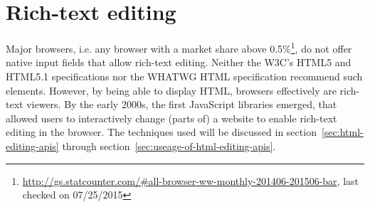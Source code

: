 \section{Rich-text editing}

Major browsers, i.e. any browser with a market share above 0.5\%\footnote{\url{http://gs.statcounter.com/\#all-browser-ww-monthly-201406-201506-bar}, last checked on 07/25/2015}, do not offer native input fields that allow rich-text editing. Neither the W3C's HTML5 and HTML5.1 specifications nor the WHATWG HTML specification recommend such elements. However, by being able to display HTML, browsers effectively are rich-text viewers. By the early 2000s, the first JavaScript libraries emerged, that allowed users to interactively change (parts of) a website to enable rich-text editing in the browser. The techniques used will be discussed in section~\ref{sec:html-editing-apis} through section~\ref{sec:useage-of-html-editing-apis}.

